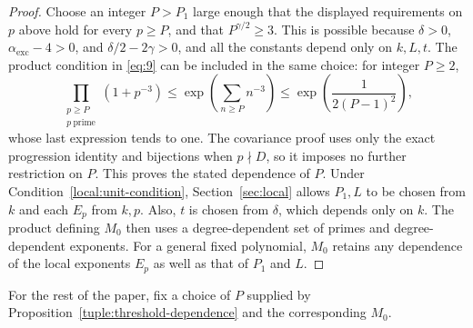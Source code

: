 \begin{proof}
Choose an integer $P>P_1$ large enough that the displayed requirements
on $p$ above hold for every $p\ge P$, and that $P^{\gamma/2}\ge3$.
This is possible because $\delta>0$, $\alpha_{\mathrm{exc}}-4>0$, and
$\delta/2-2\gamma>0$, and all the constants depend only on $k,L,t$.
The product condition in \eqref{eq:9} can be
included in the same choice: for integer $P\ge2$,
\[
 \prod_{\substack{p\ge P\\p\ \mathrm{prime}}}(1+p^{-3})
 \le \exp\left(\sum_{n\ge P}n^{-3}\right)
 \le \exp\left(\frac{1}{2(P-1)^2}\right),
\]
whose last expression tends to one.  The covariance proof uses only the
exact progression identity and bijections when $p\nmid D$, so it imposes
no further restriction on $P$.  This proves the stated dependence of $P$.
Under Condition~\eqref{local:unit-condition}, Section~\ref{sec:local}
allows $P_1,L$ to be chosen from $k$ and each $E_p$ from $k,p$.  Also,
$t$ is chosen from $\delta$, which depends only on $k$.  The product defining $M_0$
then uses a degree-dependent set of primes and degree-dependent
exponents.  For a general fixed polynomial, $M_0$ retains any dependence
of the local exponents $E_p$ as well as that of $P_1$ and $L$.
\end{proof}

For the rest of the paper, fix a choice of $P$ supplied by
Proposition~\ref{tuple:threshold-dependence} and the corresponding $M_0$.
